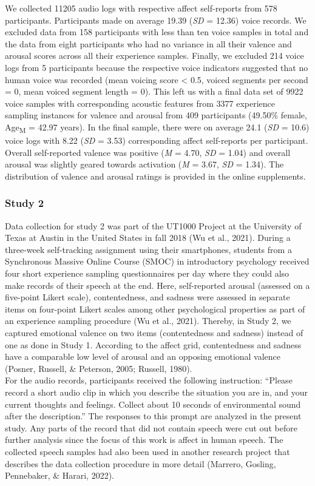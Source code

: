 \documentclass[
  english,
  man,floatsintext]{apa6}
\begin{document}
We collected 11205 audio logs with respective affect self-reports from 578 participants. Participants made on average 19.39 (\emph{SD} = 12.36) voice records. We excluded data from 158 participants with less than ten voice samples in total and the data from eight participants who had no variance in all their valence and arousal scores across all their experience samples. Finally, we excluded 214 voice logs from 5 participants because the respective voice indicators suggested that no human voice was recorded (mean voicing score \textless{} 0.5, voiced segments per second = 0, mean voiced segment length = 0).
This left us with a final data set of 9922 voice samples with corresponding acoustic features from 3377 experience sampling instances for valence and arousal from 409 participants (49.50\% female, Age\textsubscript{M} = 42.97 years). In the final sample, there were on average 24.1 (\emph{SD} = 10.6) voice logs with 8.22 (\emph{SD} = 3.53) corresponding affect self-reports per participant. Overall self-reported valence was positive (\emph{M} = 4.70, \emph{SD} = 1.04) and overall arousal was slightly geared towards activation (\emph{M} = 3.67, \emph{SD} = 1.34). The distribution of valence and arousal ratings is provided in the online supplements.

\hypertarget{study-2}{%
\subsubsection{Study 2}\label{study-2}}

Data collection for study 2 was part of the UT1000 Project at the University of Texas at Austin in the United States in fall 2018 (Wu et al., 2021). During a three-week self-tracking assignment using their smartphones, students from a Synchronous Massive Online Course (SMOC) in introductory psychology received four short experience sampling questionnaires per day where they could also make records of their speech at the end. Here, self-reported arousal (assessed on a five-point Likert scale), contentedness, and sadness were assessed in separate items on four-point Likert scales among other psychological properties as part of an experience sampling procedure (Wu et al., 2021). Thereby, in Study 2, we captured emotional valence on two items (contentedness and sadness) instead of one as done in Study 1. According to the affect grid, contentedness and sadness have a comparable low level of arousal and an opposing emotional valence (Posner, Russell, \& Peterson, 2005; Russell, 1980).\\
For the audio records, participants received the following instruction: ``Please record a short audio clip in which you describe the situation you are in, and your current thoughts and feelings. Collect about 10 seconds of environmental sound after the description.'' The responses to this prompt are analyzed in the present study. Any parts of the record that did not contain speech were cut out before further analysis since the focus of this work is affect in human speech. The collected speech samples had also been used in another research project that describes the data collection procedure in more detail (Marrero, Gosling, Pennebaker, \& Harari, 2022).
\end{document}
